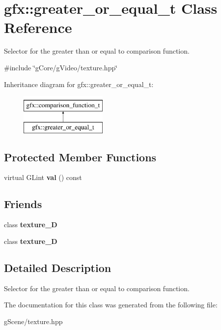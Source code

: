 \hypertarget{classgfx_1_1greater__or__equal__t}{\section{gfx\-:\-:greater\-\_\-or\-\_\-equal\-\_\-t Class Reference}
\label{classgfx_1_1greater__or__equal__t}
}


Selector for the greater than or equal to comparison function.  




{\ttfamily \#include \char`\"{}g\-Core/g\-Video/texture.\-hpp\char`\"{}}

Inheritance diagram for gfx\-:\-:greater\-\_\-or\-\_\-equal\-\_\-t\-:\begin{figure}[H]
\begin{center}
\leavevmode
\includegraphics[height=2.000000cm]{classgfx_1_1greater__or__equal__t}
\end{center}
\end{figure}
\subsection*{Protected Member Functions}
\begin{DoxyCompactItemize}
\item 
\hypertarget{classgfx_1_1greater__or__equal__t_a6d61e5879883460be6ea338742cd2451}{virtual G\-Lint {\bfseries val} () const }\label{classgfx_1_1greater__or__equal__t_a6d61e5879883460be6ea338742cd2451}

\end{DoxyCompactItemize}
\subsection*{Friends}
\begin{DoxyCompactItemize}
\item 
\hypertarget{classgfx_1_1greater__or__equal__t_a2039d67f6166ccf823c78e3476aad9aa}{class {\bfseries texture\-\_\-D}}\label{classgfx_1_1greater__or__equal__t_a2039d67f6166ccf823c78e3476aad9aa}

\item 
\hypertarget{classgfx_1_1greater__or__equal__t_a22ad86ef46c3b17357a0cd59e50bc7dd}{class {\bfseries texture\-\_\-D}}\label{classgfx_1_1greater__or__equal__t_a22ad86ef46c3b17357a0cd59e50bc7dd}

\end{DoxyCompactItemize}


\subsection{Detailed Description}
Selector for the greater than or equal to comparison function. 

The documentation for this class was generated from the following file\-:\begin{DoxyCompactItemize}
\item 
g\-Scene/texture.\-hpp\end{DoxyCompactItemize}
